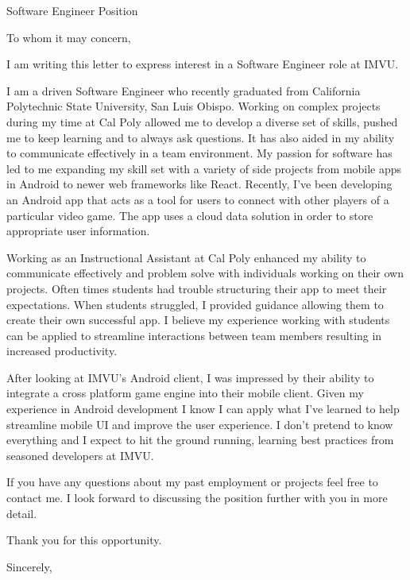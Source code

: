 \documentclass[]{letter}
\makeatletter
\newcommand{\role}{Software Engineer }
\newcommand{\company}{IMVU}
\newcommand{\roleAt}{\role role at \company}
\newcommand{\university}{California Polytechnic State University, San Luis Obispo}
\newcommand{\email}{griffinpjohnson@gmail.com}
\newcommand{\phoneNum}{(425) 417 - 5098 }
\newcommand{\myname}{Griffin Johnson}
\makeatother
\begin{document}

\begin{letter}
{
	\role Position
}

\address
{
	\myname \\
	1200 Oceanaire Dr Apt B \\
	San Luis Obispo, CA 93405 \\
	\email \\
	\phoneNum
}

\newcommand{\imvu}
{
	After looking at IMVU's Android client, I was impressed by their ability to integrate a cross platform game engine into their mobile client. Given my experience in Android development I know I can apply what I've learned to help streamline mobile UI and improve the user experience. I don't pretend to know everything and I expect to hit the ground running, learning best practices from seasoned developers at IMVU.
}

\opening{To whom it may concern,}

I am writing this letter to express interest in a \roleAt.

I am a driven Software Engineer who recently graduated from \university. Working on complex projects during my time at Cal Poly allowed me to develop a diverse set of skills, pushed me to keep learning and to always ask questions. It has also aided in my ability to communicate effectively in a team environment. My passion for software has led to me expanding my skill set with a variety of side projects from mobile apps in Android to newer web frameworks like React. Recently, I've been developing an Android app that acts as a tool for users to connect with other players of a particular video game. The app uses a cloud data solution in order to store appropriate user information.


Working as an Instructional Assistant at Cal Poly enhanced my ability to communicate effectively and problem solve with individuals working on their own projects. Often times students had trouble structuring their app to meet their expectations. When students struggled, I provided guidance allowing them to create their own successful app. I believe my experience working with students can be applied to streamline interactions between team members resulting in increased productivity. 

\imvu

If you have any questions about my past employment or projects feel free to contact me. I look forward to discussing the position further with you in more detail.  

Thank you for this opportunity.

\signature
{ 
	\myname
}


\closing
{
	Sincerely,
}


\end{letter}
\end{document}
